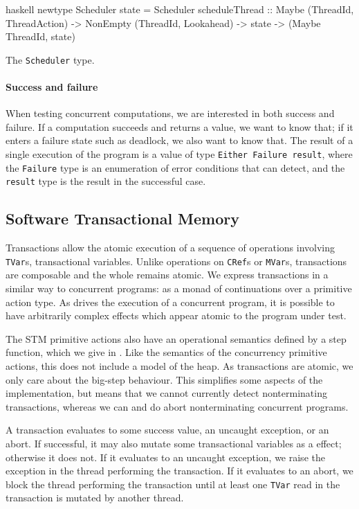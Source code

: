 \begin{listing}
\centering
\begin{cminted}{haskell}
newtype Scheduler state = Scheduler
  { scheduleThread
    :: Maybe (ThreadId, ThreadAction)
    -> NonEmpty (ThreadId, Lookahead)
    -> state
    -> (Maybe ThreadId, state)
  }
\end{cminted}
\caption{The \dejafu{} \texttt{Scheduler} type.}\label{lst:scheduler}
\end{listing}

\paragraph{Success and failure}
When testing concurrent computations, we are interested in both
success and failure.  If a computation succeeds and returns a value,
we want to know that; if it enters a failure state such as deadlock,
we also want to know that.  The result of a single execution of the
program is a value of type \verb|Either Failure result|, where the
\verb|Failure| type is an enumeration of error conditions that
\dejafu{} can detect, and the \verb|result| type is the result in the
successful case.

\subsection{Software Transactional Memory}

Transactions allow the atomic execution of a sequence of operations
involving \verb|TVar|s, transactional variables.  Unlike operations on
\verb|CRef|s or \verb|MVar|s, transactions are composable and the
whole remains atomic.  We express transactions in a similar way to
concurrent programs: as a monad of continuations over a primitive
action type.  As \dejafu{} drives the execution of a concurrent
program, it is possible to have arbitrarily complex effects which
appear atomic to the program under test.

The STM primitive actions also have an operational semantics defined
by a step function, which we give in .  Like the
semantics of the concurrency primitive actions, this does not include
a model of the heap.  As transactions are atomic, we only care about
the big-step behaviour.  This simplifies some aspects of the
implementation, but means that we cannot currently detect
nonterminating transactions, whereas we can and do abort
nonterminating concurrent programs.

A transaction evaluates to some success value, an uncaught exception,
or an abort.  If successful, it may also mutate some transactional
variables as a effect; otherwise it does not.  If it evaluates to an
uncaught exception, we raise the exception in the thread performing
the transaction.  If it evaluates to an abort, we block the thread
performing the transaction until at least one \verb|TVar| read in the
transaction is mutated by another thread.

